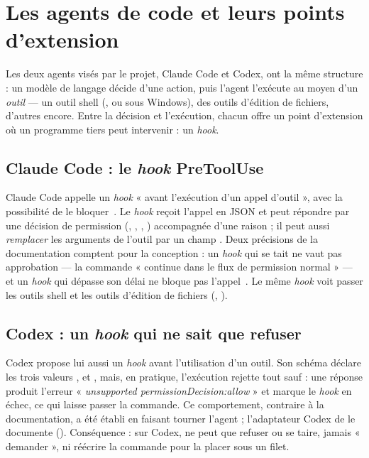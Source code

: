 \section{Les agents de code et leurs points d'extension}
\label{sec:agents}

Les deux agents visés par le projet, Claude Code et Codex, ont la même structure : un
modèle de langage décide d'une action, puis l'agent l'exécute au moyen d'un \emph{outil}
--- un outil shell (, ou  sous Windows), des outils d'édition
de fichiers, d'autres encore. Entre la décision et l'exécution, chacun offre un point
d'extension où un programme tiers peut intervenir : un \textit{hook}.

\subsection{Claude Code : le \textit{hook} PreToolUse}
Claude Code appelle un \textit{hook}  « avant l'exécution d'un appel
d'outil », avec la possibilité de le bloquer~\cite{cc-hooks}. Le \textit{hook} reçoit
l'appel en JSON et peut répondre par une décision de permission (, ,
, ) accompagnée d'une raison ; il peut aussi \emph{remplacer} les
arguments de l'outil par un champ . Deux précisions de la documentation
comptent pour la conception : un \textit{hook} qui se tait ne vaut pas approbation --- la
commande « continue dans le flux de permission normal » --- et un \textit{hook} qui dépasse
son délai ne bloque pas l'appel~\cite{cc-hooks}. Le même \textit{hook} voit passer les
outils shell et les outils d'édition de fichiers (, ).

\subsection{Codex : un \textit{hook} qui ne sait que refuser}
Codex propose lui aussi un \textit{hook} avant l'utilisation d'un outil. Son schéma déclare
les trois valeurs ,  et , mais, en pratique, l'exécution
rejette tout sauf  : une réponse  produit l'erreur
« \textit{unsupported permissionDecision:allow} » et marque le \textit{hook} en échec, ce
qui laisse passer la commande. Ce comportement, contraire à la documentation, a été
établi en faisant tourner l'agent ; l'adaptateur Codex de \demo{} le documente
(). Conséquence : sur Codex, \demo{} ne peut que refuser ou se
taire, jamais « demander », ni réécrire la commande pour la placer sous un filet.


